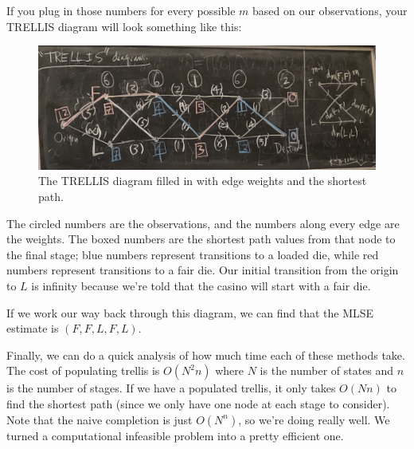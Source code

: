 \documentclass[11 pt]{scrartcl}
\begin{document}
If you plug in those numbers for every possible $m$ based on our observations, your TRELLIS diagram will look something like this: 

\begin{figure}[!htb]
    \centering 
    \includegraphics[scale=0.13]{trellis_complete.jpg}
    \caption{The TRELLIS diagram filled in with edge weights and the shortest path.}
\end{figure}

The circled numbers are the observations, and the numbers along every edge are the weights. The boxed numbers are the shortest path values from that node to the final stage; blue numbers represent transitions to a loaded die, while red numbers represent transitions to a fair die. Our initial transition from the origin to $L$ is infinity because we're told that the casino will start with a fair die. 

If we work our way back through this diagram, we can find that the MLSE estimate is $(F, F, L, F, L)$. 

Finally, we can do a quick analysis of how much time each of these methods take. The cost of populating trellis is $O(N^2 n)$ where $N$ is the number of states and $n$ is the number of stages. If we have a populated trellis, it only takes $O(Nn)$ to find the shortest path (since we only have one node at each stage to consider). Note that the naive completion is just $O(N^n)$, so we're doing really well. We turned a computational infeasible problem into a pretty efficient one. 
\end{document}
